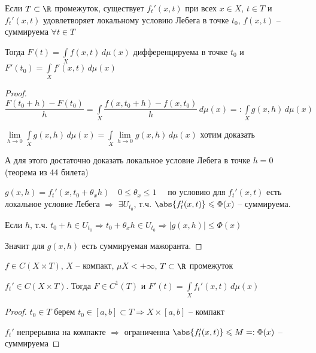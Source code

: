 
\begin{theorem}\thmslashn
	
	Если $T\subset \R$ промежуток, существует $f_t'(x, t)$ при всех $x \in X$, $t \in T$ и $f_t'(x, t)$ удовлетворяет локальному условию Лебега в точке $t_0$, $f(x, t)$ -- суммируема $\forall t \in T$
	
	Тогда $F(t) = \int\limits_X f(x,t) \, d\mu (x)$ дифференцируема в точке $t_0$ и $F'(t_0) = \int\limits_X f'(x,t) \, d\mu (x)$
	
\end{theorem}

\begin{proof}\thmslashn
	
	$\dfrac{F(t_0 + h) - F(t_0)}{h} = \int\limits_X \dfrac{f(x, t_0 + h) - f(x, t_0)}{h}\,d\mu(x) =: \int\limits_X g(x, h)\,d\mu (x)$
	
	$\lim\limits_{h \to 0} \int\limits_X g(x, h)\,d\mu(x) = \int\limits_X \lim\limits_{h \to 0} g(x, h)\,d\mu(x)$ хотим доказать
	
	А для этого достаточно доказать локальное условие Лебега в точке $h = 0$ (теорема из 44 билета)
	
	$g(x, h) = f_t'(x, t_0 + \theta_x h) \quad 0 \leqslant \theta_x \leqslant 1 \quad$ по условию для $f_t'(x, t)$ есть локальное условие Лебега $\Rightarrow$ $\exists U_{t_0}$, т.ч. $\abs{f_t'(x, t)} \leqslant \Phi(x)$ -- суммируема. 
	
	Если $h$, т.ч. $t_0 + h \in U_{t_0} \Rightarrow t_0 + \theta_xh \in U_{t_0} \Rightarrow |g(x, h)| \leqslant \Phi(x)$ 
	
	Значит для $g(x, h)$ есть суммируемая мажоранта.
	
\end{proof}



\begin{consequence}\thmslashn
	
	$f \in C(X\times T)$, $X$ -- компакт, $\mu X < + \infty$, $T \subset \R$ промежуток
	
	$f_t' \in C(X \times T)$. Тогда $F \in C^1(T)$ и $F'(t) = \int\limits_X f_t'(x, t)\,d\mu(x)$
	
\end{consequence}

\begin{proof}\thmslashn
	
	$t_0 \in T$ берем $t_0 \in [a,b] \subset T \Rightarrow X \times [a, b]$ -- компакт
	
	$f_t'$ непрерывна на компакте $\Rightarrow$ ограниченна $\abs{f_t'(x, t)} \leqslant M =: \Phi(x)$ -- суммируема
	
\end{proof}

